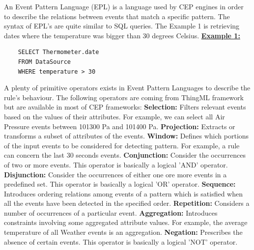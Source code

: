 \documentclass[11pt]{article}
\begin{document}
An Event Pattern Language (EPL) is a language used by CEP engines in order to describe the relations between events that match a specific pattern. The syntax of EPL's are quite similar to SQL queries. The Example 1 is retrieving dates where the temperature was bigger than 30 degrees Celsius.
\newline
\newline
\underline{\textbf{Example 1:}}
\begin{verbatim}
	SELECT Thermometer.date
	FROM DataSource
	WHERE temperature > 30
\end{verbatim}
A plenty of primitive operators exists in Event Pattern Languages to describe the rule's behaviour. The following operators are coming from ThingML framework but are available in most of CEP frameworks:
\newline
\newline
\textbf{Selection:} Filters relevant events based on the values of their attributes.\cite{6} For example, we can select all Air Pressure events between 101300 Pa and 101400 Pa.
\newline
\textbf{Projection:} Extracts or transforms a subset of attributes of the events.\cite{6}
\newline
\textbf{Window:} Defines which portions of the input events to be considered for detecting pattern.\cite{6} For example, a rule can concern the last 30 seconds events.
\newline
\textbf{Conjunction:} Consider the occurrences of two or more events.\cite{6} This operator is basically a logical 'AND' operator.
\newline
\textbf{Disjunction:} Consider the occurrences of either one ore more events in a predefined set.\cite{6} This operator is basically a logical 'OR' operator.
\newline
\textbf{Sequence:} Introduces ordering relations among events of a pattern which is satisfied when all the events have been detected in the specified order.\cite{6}
\newline
\textbf{Repetition:} Considers a number of occurrences of a particular event.\cite{6}
\newline
\textbf{Aggregation:} Introduces constraints involving some aggregated attribute values.\cite{6} For example, the average temperature of all Weather events is an aggregation.
\newline
\textbf{Negation:} Prescribes the absence of certain events.\cite{6} This operator is basically a logical 'NOT' operator.
\end{document}
